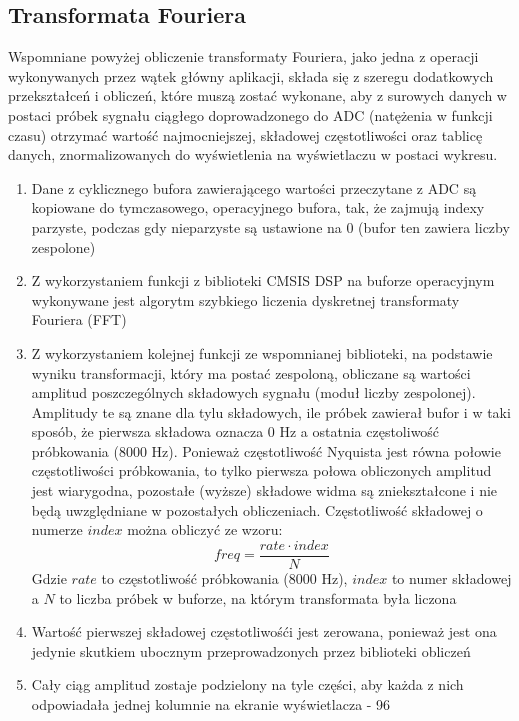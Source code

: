 \documentclass{article}
\begin{document}
\subsection{Transformata Fouriera}
Wspomniane powyżej obliczenie transformaty Fouriera, jako jedna z operacji wykonywanych przez wątek główny aplikacji, składa się z szeregu dodatkowych przekształceń i obliczeń, które muszą zostać wykonane, aby z surowych danych w postaci próbek sygnału ciągłego doprowadzonego do ADC (natężenia w funkcji czasu) otrzymać wartość najmocniejszej, składowej częstotliwości oraz tablicę danych, znormalizowanych do wyświetlenia na wyświetlaczu w postaci wykresu.
\begin{enumerate}
    \item Dane z cyklicznego bufora zawierającego wartości przeczytane z ADC są kopiowane do tymczasowego, operacyjnego bufora, tak, że zajmują indexy parzyste, podczas gdy nieparzyste są ustawione na 0 (bufor ten zawiera liczby zespolone)
    \item Z wykorzystaniem funkcji z biblioteki CMSIS DSP na buforze operacyjnym wykonywane jest algorytm szybkiego liczenia dyskretnej transformaty Fouriera (FFT)
    \item Z wykorzystaniem kolejnej funkcji ze wspomnianej biblioteki, na podstawie wyniku transformacji, który ma postać zespoloną, obliczane są wartości amplitud poszczególnych składowych sygnału (moduł liczby zespolonej). Amplitudy te są znane dla tylu składowych, ile próbek zawierał bufor i w taki sposób, że pierwsza składowa oznacza 0 Hz a ostatnia częstoliwość próbkowania (8000 Hz). Ponieważ częstotliwość Nyquista jest równa połowie częstotliwości próbkowania, to tylko pierwsza połowa obliczonych amplitud jest wiarygodna, pozostałe (wyższe) składowe widma są zniekształcone i nie będą uwzględniane w pozostałych obliczeniach. Częstotliwość składowej o numerze $index$ można obliczyć ze wzoru:
        \begin{equation}
            freq = \frac{rate \cdot index}{N}  \label{fft_freq}
        \end{equation}
        Gdzie $rate$ to częstotliwość próbkowania (8000 Hz), $index$ to numer składowej a $N$ to liczba próbek w buforze, na którym transformata była liczona
    \item Wartość pierwszej składowej częstotliwośći jest zerowana, ponieważ jest ona jedynie skutkiem ubocznym przeprowadzonych przez biblioteki obliczeń
    \item Cały ciąg amplitud zostaje podzielony na tyle części, aby każda z nich odpowiadała jednej kolumnie na ekranie wyświetlacza - 96

\end{enumerate}
\end{document}
